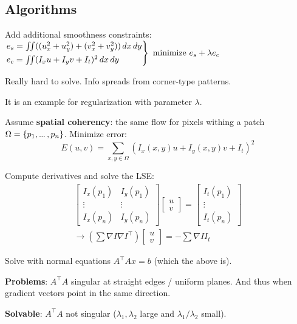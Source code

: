 \subsection{Algorithms}

\begin{algorithm}
  Add additional smoothness constraints:
  \(\begin{rcases*}
    e_s = \iint ((u_x^2 + u_y^2) + (v_x^2 + v_y^2)) \,dx \,dy \\
    e_c = \iint (I_x u + I_yv +I_t)^2 \,dx \,dy
  \end{rcases*} \ \text{minimize} \ e_s + \lambda e_c \)

  Really hard to solve. Info spreads from corner-type patterns.

  It is an example for regularization with parameter \(\lambda\).
\end{algorithm}

\begin{algorithm}
  Assume \textbf{spatial coherency}: the same flow for pixels withing a patch \(\Omega = \{p_1, \sdots , p_n\}\). Minimize error:
  \[E(u, v) = \sum_{x, y \in \Omega} (I_x(x, y) u + I_y(x, y) v + I_t)^2\]
  
  Compute derivatives and solve the LSE:
  \begin{gather*}
    \begin{bmatrix}
    I_x(p_1) & I_y(p_1) \\ \vdots & \vdots \\ I_x(p_n) & I_y(p_n)
  \end{bmatrix} \begin{bmatrix}
    u \\ v
  \end{bmatrix} =  \begin{bmatrix}
    I_t(p_1) \\ \vdots \\ I_t(p_n)
  \end{bmatrix} \\
  \to (\sum \nabla I \nabla I^\top)\begin{bmatrix}
    u \\ v
  \end{bmatrix} = - \sum \nabla I I_t
  \end{gather*}

  Solve with normal equations \(A^\top A x = b\) (which the above is).

  \textbf{Problems}: \(A^\top A\) singular at straight edges / uniform planes. And thus when gradient vectors point in the same direction.

  \textbf{Solvable}: \(A^\top A\) not singular (\(\lambda_1, \lambda_2\) large and \(\lambda_1 / \lambda_2\) small).
\end{algorithm}


